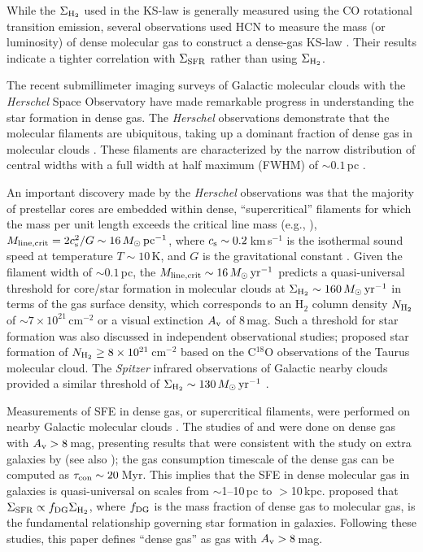 \documentclass[proof]{pasj01}
\begin{document}
While the $\Sigma_{\rm H_2}$ used in the KS-law is generally measured using the CO rotational transition emission, several observations used HCN to measure the mass (or luminosity) of dense molecular gas to construct a dense-gas KS-law \citep{gao2004a,gao2004b,use2015,big2016}. 
Their results indicate a tighter correlation with $\Sigma_{\rm SFR}$ rather than using $\Sigma_{\rm H_2}$.

The recent submillimeter imaging surveys of Galactic molecular clouds with the {\it Herschel} Space Observatory have made remarkable progress in understanding the star formation in dense gas.
The {\it Herschel} observations demonstrate that the molecular filaments are ubiquitous, taking up a dominant fraction of dense gas in molecular clouds \citep{and2010, mol2010}. 
These filaments are characterized by the narrow distribution of central widths with a full width at half maximum (FWHM) of $\sim0.1$\,pc \citep{arz2011}.

An important discovery made by the {\it Herschel} observations was that the majority of prestellar cores are embedded within dense, ``supercritical'' filaments for which the mass per unit length exceeds the critical line mass (e.g., \cite{inu1997}), $M_{\rm line, crit} = 2 c_{\rm s}^2/G \sim 16\,M_\odot\,{\rm pc^{-1}}$, where $c_{\rm s}\sim0.2$\,km\,s$^{-1}$ is the isothermal sound speed at temperature $T \sim 10$\,K, and $G$ is the gravitational constant \citep{and2014}.
Given the filament width of $\sim0.1$\,pc, the $M_{\rm line, crit} \sim 16\,M_\odot\,{\rm yr^{-1}}$ predicts a quasi-universal threshold for core/star formation in molecular clouds at $\Sigma_{\rm H_2} \sim 160\,M_\odot\,{\rm yr^{-1}}$ in terms of the gas surface density, which corresponds to an H$_2$ column density $N_{\rm H_2}$ of $\sim7\times 10^{21}$\,cm$^{-2}$ or a visual extinction $A_{\rm v}$ of $8$\,mag.
Such a threshold for star formation was also discussed in independent observational studies; \citet{oni1998} proposed star formation of $N_{\rm H_2} \geq 8\times10^{21}$\,cm$^{-2}$ based on the C$^{18}$O observations of the Taurus molecular cloud.
The {\it Spitzer} infrared observations of Galactic nearby clouds provided a similar threshold of $\Sigma_{\rm H_2} \sim 130\,M_\odot\,{\rm yr^{-1}}$ \citep{hei2010}.

Measurements of SFE in dense gas, or supercritical filaments, were performed on nearby Galactic molecular clouds \citep{wu2005, lad2010, lad2012, shi2017}.
The studies of \citet{lad2010} and \citet{shi2017} were done on dense gas with $A_{\rm v} > 8$\,mag, presenting results that were consistent with the study on extra galaxies by \citet{gao2004a} (see also \cite{big2016}); the gas consumption timescale of the dense gas can be computed as $\tau_{\rm con}\sim20$\,Myr.
This implies that the SFE in dense molecular gas in galaxies is quasi-universal on scales from $\sim$1--10\,pc to $>$10\,kpc.
\citet{lad2010} proposed that $\Sigma_{\rm SFR} \propto f_{\rm DG}\Sigma_{\rm H_2}$, where $f_{\rm DG}$ is the mass fraction of dense gas to molecular gas, is the fundamental relationship governing star formation in galaxies.
Following these studies, this paper defines ``dense gas'' as gas with $A_{\rm v} > 8$\,mag.
\end{document}
